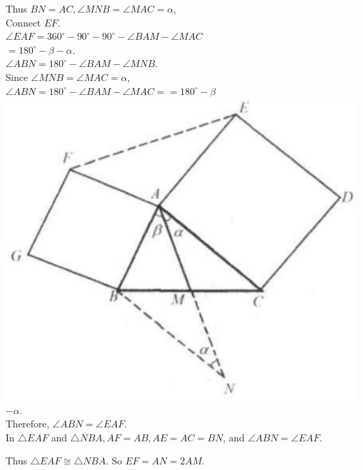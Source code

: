 \documentclass{article}
\begin{document}
Thus \(B N=A C, \angle M N B=\angle M A C=\alpha\),\\
Connect \(E F\).\\
\(\angle E A F=360^{\circ}-90^{\circ}-90^{\circ}-\angle B A M-\angle M A C\)\\
\(=180^{\circ}-\beta-\alpha\).\\
\(\angle A B N=180^{\circ}-\angle B A M-\angle M N B\).\\
Since \(\angle M N B=\angle M A C=\alpha\),\\
\(\angle A B N=180^{\circ}-\angle B A M-\angle M A C==180^{\circ}-\beta\)\\
\centering
\includegraphics[width=\textwidth]{images/reasoning_image_1.jpg}\\
\(-\alpha\).\\
Therefore, \(\angle A B N=\angle E A F\).\\
In \(\triangle E A F\) and \(\triangle N B A, A F=A B, A E=A C=B N\), and \(\angle A B N=\angle E A F\).

Thus \(\triangle E A F \cong \triangle N B A\). So \(E F=A N=2 A M\).
\end{document}
